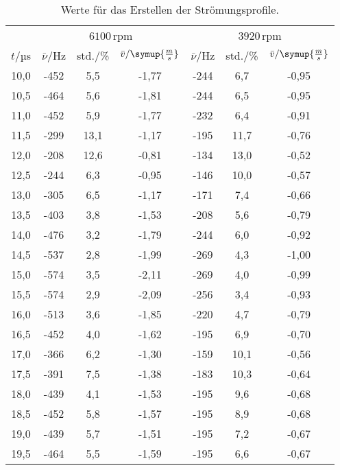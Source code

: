 \begin{table}[htp]
        \begin{center}
          \caption{Werte für das Erstellen der Strömungsprofile.}
          \label{tab:profil}
                \begin{tabular}{ccccccc}
                \toprule
                & \multicolumn{3}{c}{$6100$\,rpm} & \multicolumn{3}{c}{$3920$\,rpm} \\\cmidrule(lr){2-4}\cmidrule(lr){5-7}
                        {$t/$µs} & {$\bar{\nu}/$Hz} & {std./\%} & {$\bar{v}/\symup{\frac{m}{s}}$} & {$\bar{\nu}/$Hz} & {std./\%} & {$\bar{v}/\symup{\frac{m}{s}}$}\\
                        \midrule
                        10,0 & -452 &  5,5 & -1,77 & -244 &  6,7 & -0,95\\
                        10,5 & -464 &  5,6 & -1,81 & -244 &  6,5 & -0,95\\
                        11,0 & -452 &  5,9 & -1,77 & -232 &  6,4 & -0,91\\
                        11,5 & -299 & 13,1 & -1,17 & -195 & 11,7 & -0,76\\
                        12,0 & -208 & 12,6 & -0,81 & -134 & 13,0 & -0,52\\
                        12,5 & -244 &  6,3 & -0,95 & -146 & 10,0 & -0,57\\
                        13,0 & -305 &  6,5 & -1,17 & -171 &  7,4 & -0,66\\
                        13,5 & -403 &  3,8 & -1,53 & -208 &  5,6 & -0,79\\
                        14,0 & -476 &  3,2 & -1,79 & -244 &  6,0 & -0,92\\
                        14,5 & -537 &  2,8 & -1,99 & -269 &  4,3 & -1,00\\
                        15,0 & -574 &  3,5 & -2,11 & -269 &  4,0 & -0,99\\
                        15,5 & -574 &  2,9 & -2,09 & -256 &  3,4 & -0,93\\
                        16,0 & -513 &  3,6 & -1,85 & -220 &  4,7 & -0,79\\
                        16,5 & -452 &  4,0 & -1,62 & -195 &  6,9 & -0,70\\
                        17,0 & -366 &  6,2 & -1,30 & -159 & 10,1 & -0,56\\
                        17,5 & -391 &  7,5 & -1,38 & -183 & 10,3 & -0,64\\
                        18,0 & -439 &  4,1 & -1,53 & -195 &  9,6 & -0,68\\
                        18,5 & -452 &  5,8 & -1,57 & -195 &  8,9 & -0,68\\
                        19,0 & -439 &  5,7 & -1,51 & -195 &  7,2 & -0,67\\
                        19,5 & -464 &  5,5 & -1,59 & -195 &  6,6 & -0,67\\
                \bottomrule
                \end{tabular}
        \end{center}
\end{table}

